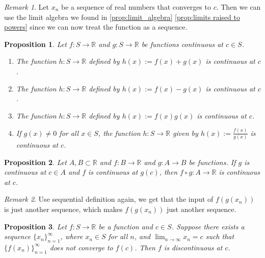 \documentclass{article}
\newtheorem{proposition}{Proposition}[section]
\theoremstyle{definition}
\theoremstyle{remark}
\newtheorem{remark}{Remark}[section]
\begin{document}
\begin{remark}
Let $x_n$ be a sequence of real numbers that converges to $c$. Then we can use the limit algebra 
we found in \ref{prop:limit_algebra} \ref{prop:limits raised to powers} since we can now treat the function as a sequence. 
\end{remark}


\vspace{.5cm}
\begin{proposition}
Let $f : S \to \mathbb{R}$ and $g : S \to \mathbb{R}$ be functions continuous at $c \in S$.
\begin{enumerate}
\item The function $h: S \to \mathbb{R}$ defined by $h(x) := f(x) + g(x)$ is continuous at $c$.
\item The function $h: S \to \mathbb{R}$ defined by $h(x) := f(x) - g(x)$ is continuous at $c$.
\item The function $h: S \to \mathbb{R}$ defined by $h(x) := f(x)g(x)$ is continuous at $c$.
\item If $g(x) \neq 0$ for all $x \in S$, the function $h: S \to \mathbb{R}$ given by $h(x) := \frac{f(x)}{g(x)}$ is continuous at $c$.
\end{enumerate}
\end{proposition}


\vspace{.5cm}
\begin{proposition}
Let $A, B \subset \mathbb{R}$ and $f : B \to \mathbb{R}$ and $g : A \to B$ be functions. If $g$ is continuous at $c \in A$ and $f$ is continuous at $g(c)$, then $f \circ g: A \to \mathbb{R}$ is continuous at $c$.
\end{proposition}

\begin{remark}
Use sequential definition again, we get that the input of $f(g(x_n))$ is just another sequence, 
which makes $f(g(x_n))$ just another sequence.
\end{remark}


\vspace{.5cm}
\begin{proposition}
Let $f : S \to \mathbb{R}$ be a function and $c \in S$. Suppose there exists a sequence $\{x_n\}_{n=1}^{\infty}$, where $x_n \in S$ for all $n$, and $\lim_{n\to\infty} x_n = c$ such that $\{f(x_n)\}_{n=1}^{\infty}$ does not converge to $f(c)$. Then $f$ is discontinuous at $c$.
\end{proposition}


\vspace{.5cm}
\end{document}
